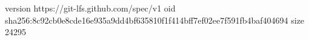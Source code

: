 version https://git-lfs.github.com/spec/v1
oid sha256:8c92cb0e8cde16e935a9dd4bf635810f1f414bff7ef02ee7f591fb4baf404694
size 24295
